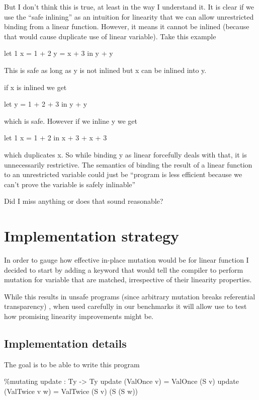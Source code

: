 \documentclass[
]{article}
\newenvironment{Shaded}{}{}
\newcommand{\DataTypeTok}[1]{\textcolor[rgb]{0.56,0.13,0.00}{#1}}
\newcommand{\NormalTok}[1]{#1}
\newcommand{\OperatorTok}[1]{\textcolor[rgb]{0.40,0.40,0.40}{#1}}
\newcommand{\OtherTok}[1]{\textcolor[rgb]{0.00,0.44,0.13}{#1}}
\begin{document}
But I don't think this is true, at least in the way I understand it. It
is clear if we use the ``safe inlining'' as an intuition for linearity
that we can allow unrestricted binding from a linear function. However,
it means it cannot be inlined (because that would cause duplicate use of
linear variable). Take this example

let 1 x = 1 + 2 y = x + 3 in y + y

This is safe as long as y is not inlined but x can be inlined into y.

if x is inlined we get

let y = 1 + 2 + 3 in y + y

which is safe. However if we inline y we get

let 1 x = 1 + 2 in x + 3 + x + 3

which duplicates x. So while binding y as linear forcefully deals with
that, it is unnecessarily restrictive. The semantics of binding the
result of a linear function to an unrestricted variable could just be
``program is less efficient because we can't prove the variable is
safely inlinable''

Did I miss anything or does that sound reasonable?

\hypertarget{implementation-strategy}{%
\section{Implementation strategy}\label{implementation-strategy}}

In order to gauge how effective in-place mutation would be for linear
function I decided to start by adding a keyword that would tell the
compiler to perform mutation for variable that are matched, irrespective
of their linearity properties.

While this results in unsafe programs (since arbitrary mutation breaks
referential transparency) , when used carefully in our benchmarks it
will allow use to test how promising linearity improvements might be.

\hypertarget{implementation-details}{%
\subsection{Implementation details}\label{implementation-details}}

The goal is to be able to write this program

\begin{Shaded}
\begin{Highlighting}[]
\OperatorTok{\%}\NormalTok{mutating}
\NormalTok{update }\OperatorTok{:} \DataTypeTok{Ty} \OtherTok{{-}\textgreater{}} \DataTypeTok{Ty}
\NormalTok{update (}\DataTypeTok{ValOnce}\NormalTok{ v) }\OtherTok{=} \DataTypeTok{ValOnce}\NormalTok{ (}\DataTypeTok{S}\NormalTok{ v)}
\NormalTok{update (}\DataTypeTok{ValTwice}\NormalTok{ v w) }\OtherTok{=} \DataTypeTok{ValTwice}\NormalTok{ (}\DataTypeTok{S}\NormalTok{ v) (}\DataTypeTok{S}\NormalTok{ (}\DataTypeTok{S}\NormalTok{ w))}
\end{Highlighting}
\end{Shaded}
\end{document}
